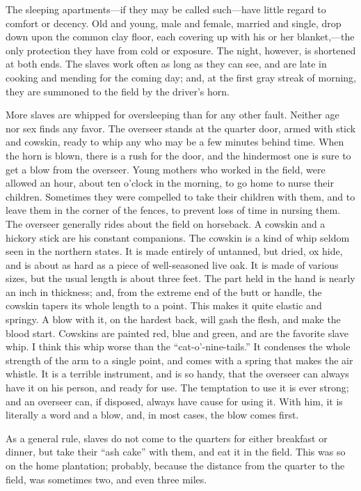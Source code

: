 The sleeping apartments---if they may be called such---have little
regard to comfort or decency. Old and young, male and female, married
and single, drop down upon the common clay floor, each covering up with
his or her blanket,---the only protection they have from cold or
exposure. The night, however, is shortened at both ends. The slaves work
often as long as they can see, and are late in cooking and mending for
the coming day; and, at the first gray streak of morning, they are
summoned to the field by the driver's horn.

More slaves are whipped for oversleeping than for any other fault.
Neither age nor sex finds any favor. The overseer stands at the quarter
door, armed with stick and cowskin, ready to whip any who may be a few
minutes behind time. When the horn is blown, there is a rush for the
door, and the hindermost one is sure to get a blow from the overseer.
Young mothers who worked in the field, were allowed an hour, about ten
o'clock in the morning, to go home to nurse their children. Sometimes
they were compelled to take their children with them, and to leave them
in the {}corner of the fences, to prevent loss of time in nursing them.
The overseer generally rides about the field on horseback. A cowskin and
a hickory stick are his constant companions. The cowskin is a kind of
whip seldom seen in the northern states. It is made entirely of
untanned, but dried, ox hide, and is about as hard as a piece of
well-seasoned live oak. It is made of various sizes, but the usual
length is about three feet. The part held in the hand is nearly an inch
in thickness; and, from the extreme end of the butt or handle, the
cowskin tapers its whole length to a point. This makes it quite elastic
and springy. A blow with it, on the hardest back, will gash the flesh,
and make the blood start. Cowskins are painted red, blue and green, and
are the favorite slave whip. I think this whip worse than the
``cat-o'-nine-tails.'' It condenses the whole strength of the arm to a
single point, and comes with a spring that makes the air whistle. It is
a terrible instrument, and is so handy, that the overseer can always
have it on his person, and ready for use. The temptation to use it is
ever strong; and an overseer can, if disposed, always have cause for
using it. With him, it is literally a word and a blow, and, in most
cases, the blow comes first.

As a general rule, slaves do not come to the quarters for either
breakfast or dinner, but take their ``ash cake'' with them, and eat it
in the field. This was so on the home plantation; probably, because the
distance from the quarter to the field, was sometimes two, and even
three miles.

